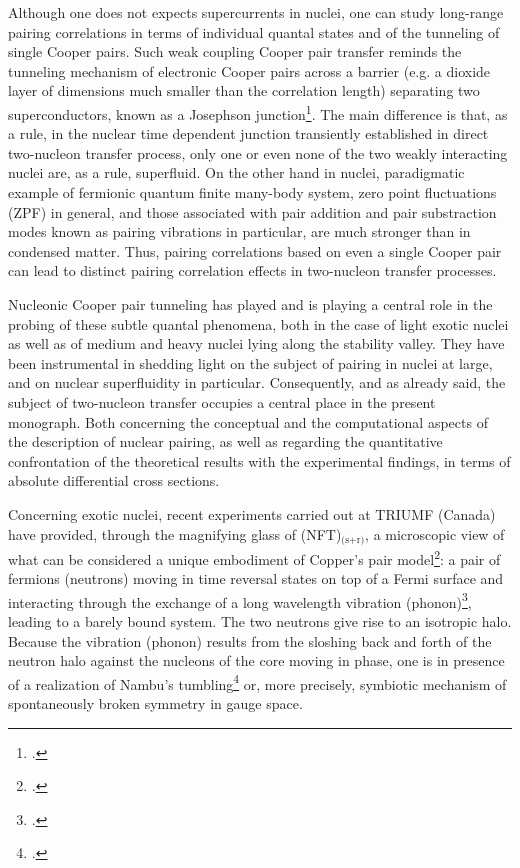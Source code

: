  
  Although one does not expects supercurrents in nuclei, one can study long-range pairing correlations in terms of individual quantal states and of the tunneling of single Cooper pairs. Such weak coupling Cooper pair transfer reminds  the tunneling mechanism of electronic Cooper pairs across a barrier (e.g. a dioxide layer of dimensions much smaller than the correlation length) separating two superconductors, known as a Josephson junction\footnote{\cite{Josephson:62,Anderson:64b}.}. The main difference is that, as a rule, in the nuclear time dependent junction transiently established in  direct two-nucleon transfer process, only one or even none of the two weakly interacting nuclei are, as a rule, superfluid.  On the other hand in nuclei, paradigmatic example of fermionic quantum  finite many-body system, zero point fluctuations  (ZPF) in general, and those associated with pair addition and pair substraction modes known as pairing vibrations in particular, are much stronger than in condensed matter. Thus, pairing correlations based on even  a single Cooper pair can lead to distinct pairing correlation effects in two-nucleon transfer processes. 
  
  
 Nucleonic Cooper pair tunneling has played and is playing a central role in the probing of these subtle quantal phenomena, both in the case of  light exotic nuclei as well as of medium and heavy nuclei lying along the stability valley. They  have been instrumental in shedding light on the subject of pairing in nuclei at large, and on nuclear superfluidity in particular. Consequently, and as already said, the subject of two-nucleon transfer occupies  a central place in the present monograph. Both concerning the conceptual and the computational aspects of the description of nuclear pairing, as well as regarding the quantitative confrontation of the theoretical  results  with the experimental findings, in terms of absolute differential cross sections.

Concerning exotic nuclei, recent experiments carried out at TRIUMF (Canada) have provided, through the magnifying glass of (NFT)$_\text{(s+r)}$, a microscopic view of what can be considered a unique embodiment of Copper's pair model\footnote{\cite{Cooper:56}.}: a pair of fermions (neutrons) moving in time reversal states on top of a  Fermi surface and interacting through the exchange of a long wavelength vibration (phonon)\footnote{\cite{Frohlich:52,Bardeen:55,Bardeen:57a,Bardeen:57b}.}, leading to a barely bound system. The two neutrons give rise to an isotropic halo. Because the vibration (phonon) results from the sloshing back and forth of the neutron halo against the  nucleons of the core moving in phase, one is in presence of a realization of Nambu's tumbling\footnote{\cite{Nambu:91}.} or, more precisely, symbiotic mechanism of spontaneously broken symmetry in gauge space.

